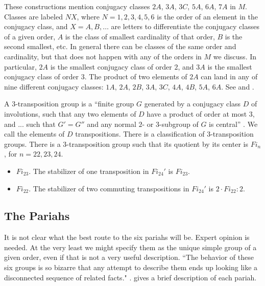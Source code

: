 These constructions mention conjugacy classes $2A$, $3A$, $3C$, $5A$,
$6A$, $7A$ in $M$. Classes are labeled $NX$, where $N=1,2,3,4,5,6$ is
the order of an element in the conjugacy class, and $X=A,B,\ldots$ are
letters to differentiate the conjugacy classes of a given order, $A$
is the class of smallest cardinality of that order, $B$ is the second
smallest, etc.  In general there can be classes of the same order and
cardinality, but that does not happen with any of the orders in $M$ we
discuss.  In particular, $2A$ is the smallest conjugacy class of order
$2$, and $3A$ is the smallest conjugacy class of order $3$.  The
product of two elements of $2A$ can land in any of nine different
conjugacy classes: $1A$, $2A$, $2B$, $3A$, $3C$, $4A$, $4B$, $5A$,
$6A$.  See \cite[p.7]{Ga} and \cite[p256]{wilson2009finite}.

A $3$-transposition group is a ``finite group $G$ generated by a
conjugacy class $D$ of involutions, such that any two elements of $D$
have a product of order at most $3$, and ... such that $G' = G''$ and
any normal $2$- or $3$-subgroup of $G$ is central''
\cite[p235]{wilson2009finite}.  We call the elements of $D$
transpositions.  There is a classification of $3$-transposition
groups.  There is a $3$-transposition group such that its quotient by
its center is $Fi_n$, for $n=22,23,24$.

\begin{itemize}
\item $Fi_{23}$.
  The stabilizer of one transposition in $Fi_{24}'$ is $Fi_{23}$.
\item $Fi_{22}$.  The stabilizer of two commuting transpositions in
  $Fi_{24}'$ is $2\cdot Fi_{22}:2$. \cite[p.250]{wilson2009finite}
\end{itemize}

\subsection{The Pariahs}

It is not clear what the best route to the six pariahs will be.
Expert opinion is needed.  At the very least we might specify them as
the unique simple group of a given order, even if that is not a very
useful description.  ``The behavior of these six groups is so bizarre
that any attempt to describe them ends up looking like a disconnected
sequence of related facts." \cite[p.184]{wilson2009finite}.
\cite[pp.150-153]{robert1998twelve} gives a brief description of each
pariah.

